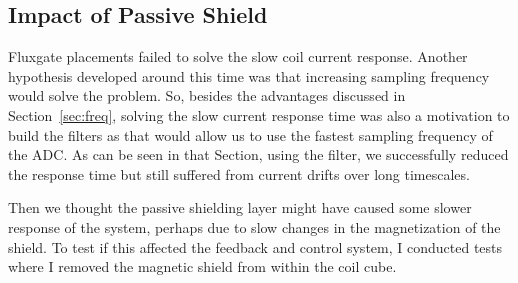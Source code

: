 



\subsection{Impact of Passive Shield}\label{sec:shield_impact}

Fluxgate placements failed to solve the slow coil current response.
Another hypothesis developed around this time was that increasing
sampling frequency would solve the problem.  So, besides the advantages
discussed in Section~\ref{sec:freq}, solving the slow current response
time was also a motivation to build the filters as that would allow us
to use the fastest sampling frequency of the ADC.  As can be seen in
that Section, using the filter, we successfully reduced the response
time but still suffered from current drifts over long timescales.

Then we thought the passive shielding layer might have caused some
slower response of the system, perhaps due to slow changes in the
magnetization of the shield. To test if this affected the feedback and
control system, I conducted tests where I removed the magnetic shield
from within the coil cube.


